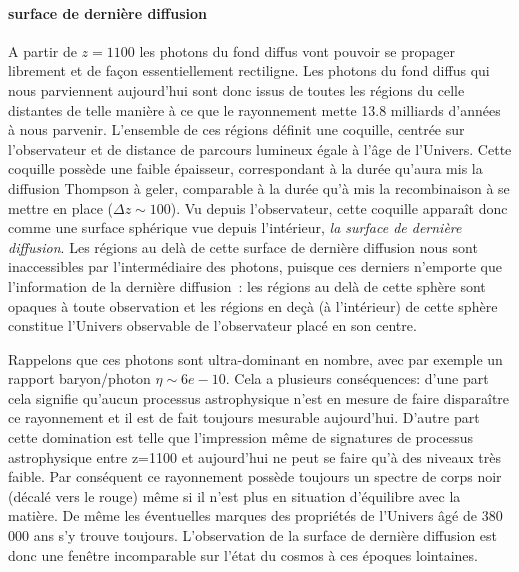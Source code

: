 \paragraph{surface de dernière diffusion}
A partir de $z=1100$ les photons du fond diffus vont pouvoir se propager librement et de façon essentiellement rectiligne. Les photons du fond diffus qui nous parviennent aujourd'hui sont donc issus de toutes les régions du celle distantes de telle manière à ce que le rayonnement mette 13.8 milliards d'années à nous parvenir. L'ensemble de ces régions définit une coquille, centrée sur l'observateur et de distance de parcours lumineux égale à l'âge de l'Univers. Cette coquille possède une faible épaisseur, correspondant à la durée qu'aura mis la diffusion Thompson à geler, comparable à la durée qu'à mis la recombinaison à se mettre en place ($\Delta z\sim 100$). Vu depuis l'observateur, cette coquille apparaît donc comme une surface sphérique vue depuis l'intérieur, \textit{la surface de dernière diffusion}. Les régions au delà de cette surface de dernière diffusion nous sont inaccessibles par l'intermédiaire des photons, puisque ces derniers n'emporte que l'information de la dernière diffusion~: les régions au delà de cette sphère sont opaques à toute observation et les régions en deçà (à l'intérieur) de cette sphère constitue l'Univers observable de l'observateur placé en son centre.

Rappelons que ces photons sont ultra-dominant en nombre, avec par exemple un rapport baryon/photon $\eta\sim6e-10$. Cela a plusieurs conséquences: d'une part cela signifie qu'aucun processus astrophysique n'est en mesure de faire disparaître ce rayonnement et il est de fait toujours mesurable aujourd'hui. D'autre part cette domination est telle que l'impression même de signatures de processus astrophysique entre z=1100 et aujourd'hui ne peut se faire qu'à des niveaux très faible. Par conséquent ce rayonnement possède toujours un spectre de corps noir (décalé vers le rouge) même si il n'est plus en situation d'équilibre avec la matière. De même les éventuelles marques des propriétés de l'Univers âgé de 380 000 ans s'y trouve toujours. L'observation de la surface de dernière diffusion est donc une fenêtre incomparable sur l'état du cosmos à ces époques lointaines.


